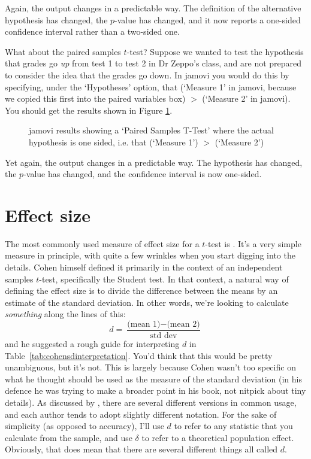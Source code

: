 Again, the output changes in a predictable way. The definition of the alternative hypothesis has changed, the $p$-value has changed, and it now reports a one-sided confidence interval rather than a two-sided one.

What about the paired samples $t$-test? Suppose we wanted to test the hypothesis that grades go {\it up} from test 1 to test 2 in Dr Zeppo's class, and are not prepared to consider the idea that the grades go down. In jamovi you would do this by specifying, under the `Hypotheses' option, that  (`Measure 1' in jamovi, because we copied this first into the paired variables box) $>$  (`Measure 2' in jamovi). You should get the results shown in Figure \ref{fig:ttest_onesided3}.

\begin{figure}[htb]
\begin{center}
\caption{jamovi results showing a `Paired Samples T-Test' where the actual hypothesis is one sided, i.e. that  (`Measure 1') $>$  (`Measure 2')}
\label{fig:ttest_onesided3}
\HR
\end{center}
\end{figure}

Yet again, the output changes in a predictable way. The hypothesis has changed, the $p$-value has changed, and the confidence interval is now one-sided. 


\section{Effect size~\label{sec:cohensd}}

The most commonly used measure of effect size for a $t$-test is  \parencite{Cohen1988}. It's a very simple measure in principle, with quite a few wrinkles when you start digging into the details. Cohen himself defined it primarily in the context of an independent samples $t$-test, specifically the Student test. In that context, a natural way of defining the effect size is to divide the difference between the means by an estimate of the standard deviation. In other words, we're looking to calculate {\it something} along the lines of this:
$$
d = \frac{\mbox{(mean 1)} - \mbox{(mean 2)}}{\mbox{std dev}}
$$
and he suggested a rough guide for interpreting $d$ in Table~\ref{tab:cohensdinterpretation}. You'd think that this would be pretty unambiguous, but it's not. This is largely because Cohen wasn't too specific on what he thought should be used as the measure of the standard deviation (in his defence he was trying to make a broader point in his book, not nitpick about tiny details). As discussed by \textcite{McGrath2006}, there are several different versions in common usage, and each author tends to adopt slightly different notation. For the sake of simplicity (as opposed to accuracy), I'll use $d$ to refer to any statistic that you calculate from the sample, and  use $\delta$ to refer to a theoretical population effect. Obviously, that does mean that there are several different things all called $d$. 

